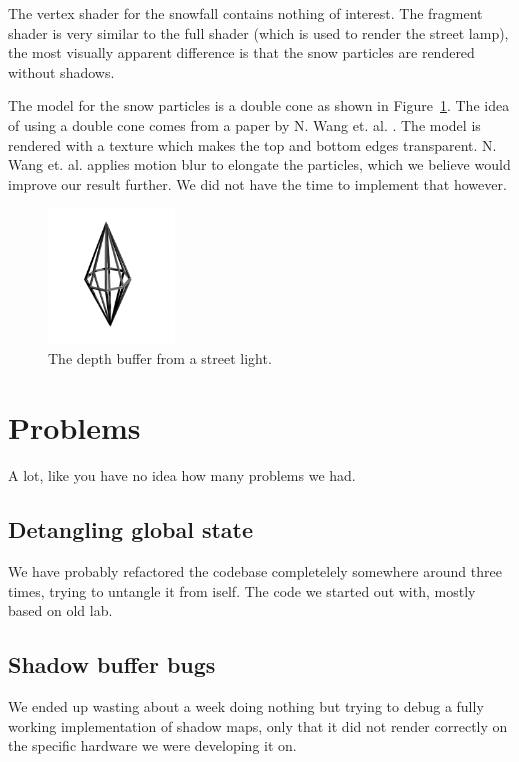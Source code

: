 \documentclass[a4paper,12pt]{article}
\begin{document}
The vertex shader for the snowfall contains nothing of interest. The fragment shader is very similar to the full shader (which is used to render the street lamp), the most visually apparent difference is that the snow particles are rendered without shadows.

The model for the snow particles is a double cone as shown in Figure~\ref{fig:dcone-image}. The idea of using a double cone comes from a paper by N. Wang et. al. \cite{snow-rain}. The model is rendered with a texture which makes the top and bottom edges transparent. N. Wang et. al. applies motion blur to elongate the particles, which we believe would improve our result further. We did not have the time to implement that however.
\begin{figure}[H]
  \centering
  \includegraphics[width=0.3\textwidth]{dcone}
  \caption{\label{fig:dcone-image} The depth buffer from a street light.}
\end{figure}


\section{Problems}

A lot, like you have no idea how many problems we had.

\subsection{Detangling global state}

We have probably refactored the codebase completelely somewhere around three times, trying to untangle it from iself. The code we started out with, mostly based on old lab.

\subsection{Shadow buffer bugs}

We ended up wasting about a week doing nothing but trying to debug a fully working implementation of shadow maps, only that it did not render correctly on the specific hardware we were developing it on.
\end{document}
